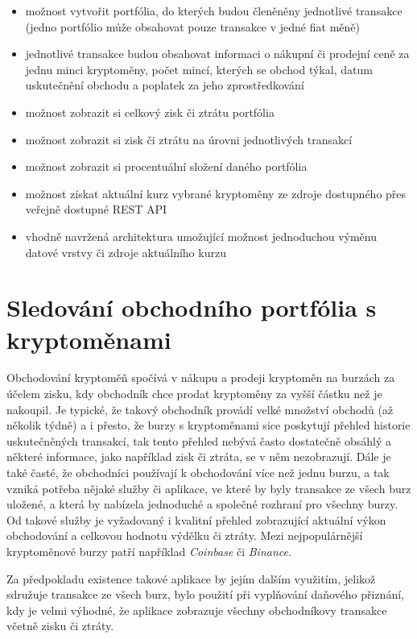 \documentclass[12pt, a4paper]{article}
\begin{document}
    \begin{itemize}
        \item možnost vytvořit portfólia, do kterých budou členěněny jednotlivé transakce (jedno portfólio může obsahovat pouze transakce v jedné fiat měně)
        \item jednotlivé transakce budou obsahovat informaci o nákupní či prodejní ceně za jednu minci kryptoměny, počet mincí, kterých se obchod týkal, datum uskutečnění obchodu a poplatek za jeho zprostředkování
        \item možnost zobrazit si celkový zisk či ztrátu portfólia
        \item možnost zobrazit si zisk či ztrátu na úrovni jednotlivých transakcí
        \item možnost zobrazit si procentuální složení daného portfólia
        \item možnost získat aktuální kurz vybrané kryptoměny ze zdroje dostupného přes veřejně dostupné REST API
        \item vhodně navržená architektura umožující možnost jednoduchou výměnu datové vrstvy či zdroje aktuálního kurzu
    \end{itemize}


    \section{Sledování obchodního portfólia s kryptoměnami}

    Obchodování kryptoměň spočívá v nákupu a prodeji kryptoměn na burzách za účelem zisku, kdy obchodník chce prodat kryptoměny za vyšší částku než je nakoupil. Je typické, že takový obchodník provádí velké množství obchodů (až několik týdně) a i přesto, že burzy s kryptoměnami sice poskytují přehled historie uskutečněných transakcí, tak tento přehled nebývá často dostatečně obsáhlý a některé informace, jako například zisk či ztráta, se v něm nezobrazují. Dále je také časté, že obchodníci používají k obchodování více než jednu burzu, a tak vzniká potřeba nějaké služby či aplikace, ve které by byly transakce ze všech burz uložené, a která by nabízela jednoduché a společné rozhraní pro všechny burzy. Od takové služby je vyžadovaný i kvalitní přehled zobrazující aktuální výkon obchodování a celkovou hodnotu výdělku či ztráty. Mezi nejpopulárnější kryptoměnové burzy patří například \textit{Coinbase} či \textit{Binance}.

    Za předpokladu existence takové aplikace by jejím dalším využitím, jelikož sdružuje transakce ze všech burz, bylo použití při vyplňování daňového přiznání, kdy je velmi výhodné, že aplikace zobrazuje všechny obchodníkovy transakce včetně zisku či ztráty.
\end{document}
